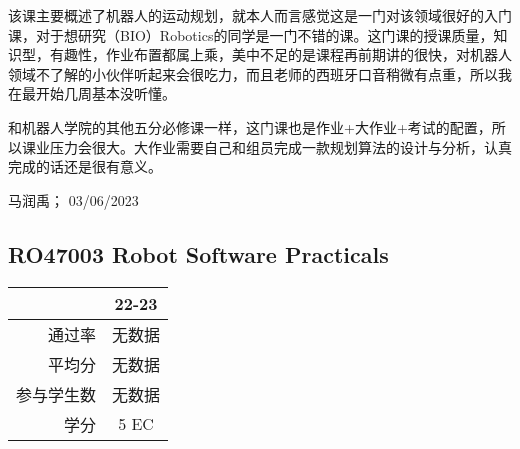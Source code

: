 该课主要概述了机器人的运动规划，就本人而言感觉这是一门对该领域很好的入门课，对于想研究（BIO）Robotics的同学是一门不错的课。这门课的授课质量，知识型，有趣性，作业布置都属上乘，美中不足的是课程再前期讲的很快，对机器人领域不了解的小伙伴听起来会很吃力，而且老师的西班牙口音稍微有点重，所以我在最开始几周基本没听懂。

和机器人学院的其他五分必修课一样，这门课也是作业+大作业+考试的配置，所以课业压力会很大。大作业需要自己和组员完成一款规划算法的设计与分析，认真完成的话还是很有意义。

\begin{flushright}
马润禹； 03/06/2023
\end{flushright}

\subsection{RO47003 Robot Software Practicals}
\begin{minipage}{0.45\textwidth}
\centering
{}
\end{minipage}%
\begin{minipage}{0.45\textwidth}
\raggedleft
\begin{tabular}{r|c}
\textbf{ } & \textbf{22-23} \\ \hline
通过率 & 无数据 \\ 
平均分 & 无数据 \\ 
参与学生数 & 无数据 \\
学分 & 5 EC\\
\end{tabular}
\end{minipage}\\

